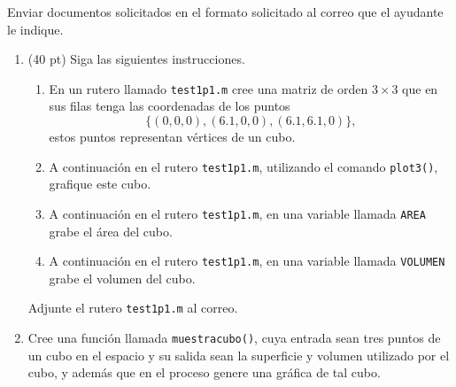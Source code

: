 \documentclass[11pt]{article}
\begin{document}
Enviar documentos solicitados en el formato solicitado al correo que el ayudante le indique.

\begin{enumerate}
\item (40 pt) Siga las siguientes instrucciones.
\begin{enumerate}
\item En un rutero llamado \texttt{test1p1.m} cree una matriz de orden $3\times 3$ que en sus filas tenga las coordenadas de los puntos 
$$
\{(0,0,0),(6.1,0,0),(6.1,6.1,0)\},
$$
estos puntos representan v\'ertices de un cubo.
\item A continuaci\'on en el rutero \texttt{test1p1.m}, utilizando el comando \texttt{plot3()}, grafique este cubo.
\item A continuaci\'on en el rutero \texttt{test1p1.m}, en una variable llamada \texttt{AREA} grabe el \'area del cubo.
\item A continuaci\'on en el rutero \texttt{test1p1.m}, en una variable llamada \texttt{VOLUMEN} grabe el volumen del cubo.
\end{enumerate}
Adjunte el rutero \texttt{test1p1.m} al correo.

\item Cree una funci\'on llamada \texttt{muestracubo()}, cuya entrada sean tres puntos de un cubo en el espacio y su salida sean la superficie y volumen utilizado por el cubo, y adem\'as que en el proceso genere una gr\'afica de tal cubo.
\end{enumerate}
\end{document}
